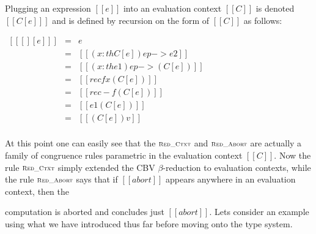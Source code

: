 \begin{definition}
  \label{def:FS-ectx-plug}
  Plugging an expression $[[e]]$ into an evaluation context $[[C]]$ is denoted $[[C[e] ]]$
  and is defined by recursion on the form of $[[C]]$ as follows:
  \begin{center}
    \begin{math}
      \begin{array}{rll}
        [[ [] [e] ]]                    & = & e\\
        [[(( x : th C ) ep -> e2)[e] ]] & = & [[( x : th C[e] ) ep -> e2]]\\
        [[(( x : th e1 ) ep -> C)[e] ]] & = & [[( x : th e1 ) ep -> (C[e]) ]]\\
        [[(rec f x C)[e] ]]             & = & [[rec f x (C[e]) ]]\\
        [[(rec - f C)[e] ]]             & = & [[rec - f (C[e]) ]]\\
        [[(e1 C)[e] ]]                  & = & [[e1 (C[e]) ]]\\
        [[(C v)[e] ]]                   & = & [[(C[e]) v]]\\
      \end{array}
    \end{math}
  \end{center}
\end{definition}
At this point one can easily see that the $\textsc{\scriptsize Red\_Ctxt}$
and $\textsc{\scriptsize Red\_Abort}$ are actually a family of congruence
rules parametric in the evaluation context $[[C]]$. Now the rule
$\textsc{\scriptsize Red\_Ctxt}$ simply extended the CBV $\beta$-reduction to
evaluation contexts, while the rule $\textsc{\scriptsize Red\_Abort}$ says
that if $[[abort]]$ appears anywhere in an evaluation context, then the

computation is aborted and concludes just $[[abort]]$.  Lets consider
an example using what we have introduced thus far before moving onto
the type system.

